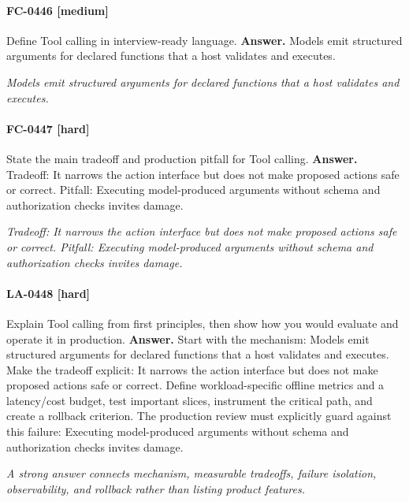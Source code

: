 \paragraph{FC-0446 [medium]} Define Tool calling in interview-ready language.
\noindent\textbf{Answer.} Models emit structured arguments for declared functions that a host validates and executes.
\par\textit{Models emit structured arguments for declared functions that a host validates and executes.}
\paragraph{FC-0447 [hard]} State the main tradeoff and production pitfall for Tool calling.
\noindent\textbf{Answer.} Tradeoff: It narrows the action interface but does not make proposed actions safe or correct. Pitfall: Executing model-produced arguments without schema and authorization checks invites damage.
\par\textit{Tradeoff: It narrows the action interface but does not make proposed actions safe or correct. Pitfall: Executing model-produced arguments without schema and authorization checks invites damage.}
\paragraph{LA-0448 [hard]} Explain Tool calling from first principles, then show how you would evaluate and operate it in production.
\noindent\textbf{Answer.} Start with the mechanism: Models emit structured arguments for declared functions that a host validates and executes. Make the tradeoff explicit: It narrows the action interface but does not make proposed actions safe or correct. Define workload-specific offline metrics and a latency/cost budget, test important slices, instrument the critical path, and create a rollback criterion. The production review must explicitly guard against this failure: Executing model-produced arguments without schema and authorization checks invites damage.
\par\textit{A strong answer connects mechanism, measurable tradeoffs, failure isolation, observability, and rollback rather than listing product features.}
